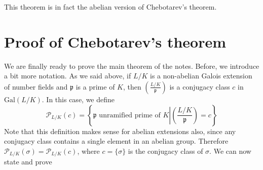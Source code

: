\documentclass[]{amsart}
\newcommand{\p}{\mathfrak{p}}
\newcommand{\PP}{\mathcal{P}}
\newcommand{\Frob}[2]{\left(\frac{#1}{#2}\right )}
\newcommand{\Gal}{\text{Gal}}
\begin{document}
		This theorem is in fact the abelian version of Chebotarev's theorem.
		
		\section{Proof of Chebotarev's theorem}
		We are finally ready to prove the main theorem of the notes. Before, we introduce a bit more notation. As we said above, if $L/K$ is a non-abelian Galois extension of number fields and $\p$ is a prime of $K$, then $\Frob{L/K}{\p}$ is a conjugacy class $c$ in $\Gal(L/K)$. In this case, we define 
		\[\PP_{L/K}(c)=\left \{\p\text{ unramified prime of }K\left |\Frob{L/K}{\p}=c\right .\right \}\]
		Note that this definition makes sense for abelian extensions also, since any conjugacy class contains a single element in an abelian group. Therefore $\PP_{L/K}(\sigma)=\PP_{L/K}(c)$, where $c=\{\sigma\}$ is the conjugacy class of $\sigma$. We can now state and prove
		
\end{document}

